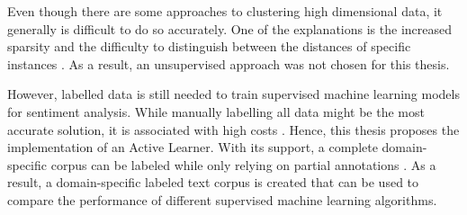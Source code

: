 \documentclass[11pt, a4paper]{article}
\begin{document}
Even though there are some approaches to clustering high dimensional data, it generally is difficult to do so accurately. 
One of the explanations is the increased sparsity and the difficulty to distinguish between the distances 
of specific instances \citep{tomasev2014roleofhubness}. As a result, an unsupervised approach was not chosen for this thesis.

However, labelled data is still needed to train supervised machine learning models for sentiment analysis. While manually labelling
all data might be the most accurate solution, it is associated with high costs \citep{miller2020activelearningapproaches}.
Hence, this thesis proposes the implementation of an Active Learner. With its support, a complete domain-specific corpus can be labeled while only relying on partial annotations \citep{park2015EfficientExtraction}.
As a result, a domain-specific labeled text corpus is created that can be used to compare the performance of different supervised machine learning algorithms.
\end{document}
